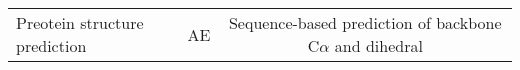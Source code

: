 \begin{center}
\begin{tabular}{l c c}
    Preotein structure prediction & AE & Sequence-based prediction of backbone C$\alpha$ and dihedral 
\end{tabular}
\end{center}
